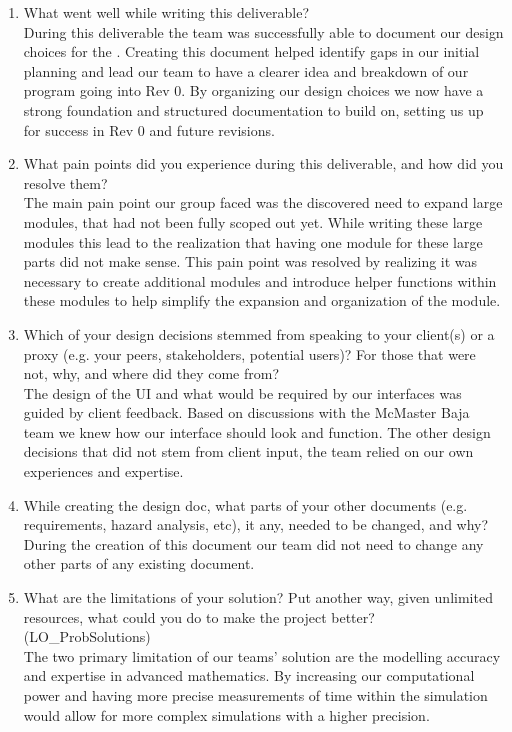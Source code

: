 \documentclass[12pt, titlepage]{article}
\begin{document}
\begin{enumerate}
  \item What went well while writing this deliverable? 
  \\
  During this deliverable the team was successfully able to document our design choices for the \progname. 
  Creating this document helped identify gaps in our initial planning and lead our team to have a clearer idea and breakdown of our program going into Rev 0.
  By organizing our design choices we now have a strong foundation and structured documentation to build on, setting us up for success in Rev 0 and future revisions. 
  \item What pain points did you experience during this deliverable, and how
    did you resolve them?
  \\
  The main pain point our group faced was the discovered need to expand large modules, that had not been fully scoped out yet.
  While writing these large modules this lead to the realization that having one module for these large parts did not make sense. 
  This pain point was resolved by realizing it was necessary to create additional modules and introduce helper functions within these modules to help simplify the expansion and organization of the module. 

  \item Which of your design decisions stemmed from speaking to your client(s)
  or a proxy (e.g. your peers, stakeholders, potential users)? For those that
  were not, why, and where did they come from?
  \\
  The design of the UI and what would be required by our interfaces was guided by client feedback. 
  Based on discussions with the McMaster Baja team we knew how our interface should look and function.
  The other design decisions that did not stem from client input, the team relied on our own experiences and expertise. 

  \item While creating the design doc, what parts of your other documents (e.g.
  requirements, hazard analysis, etc), it any, needed to be changed, and why?
  \\
  During the creation of this document our team did not need to change any other parts of any existing document. 

  \item What are the limitations of your solution?  Put another way, given
  unlimited resources, what could you do to make the project better? (LO\_ProbSolutions)
  \\
  The two primary limitation of our teams' solution are the modelling accuracy and expertise in advanced mathematics. 
  By increasing our computational power and having more precise measurements of time within the simulation would allow for more complex simulations with a higher precision.


\end{enumerate}
\end{document}
